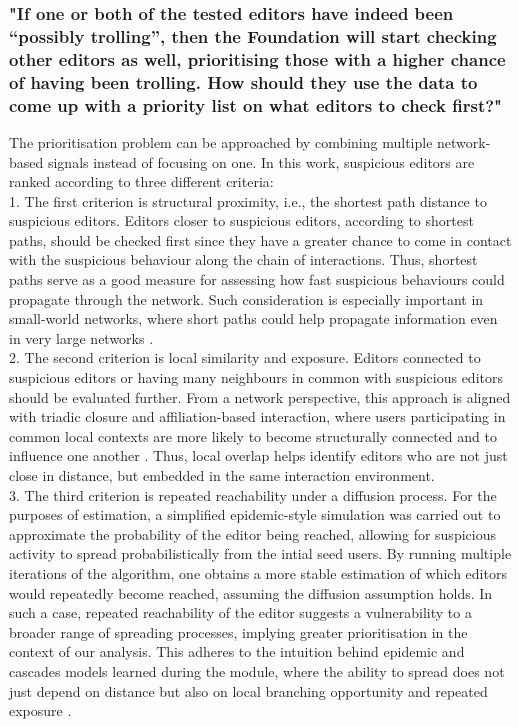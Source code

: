 \documentclass[acmsmall,nonacm,natbib=false]{acmart}
\begin{document}
\subsubsection{\large\textbf{{"If one or both of the tested editors have indeed been “possibly trolling”, then the Foundation will start checking other editors as well, prioritising those with a higher chance of having been trolling. How should they use the data to come up with a priority list on what editors to check first?"}}}
\leavevmode \par \noindent
The prioritisation problem can be approached by combining multiple network-based signals instead of focusing on one. In this work, suspicious editors are ranked according to three different criteria:\-\\
1. The first criterion is structural proximity, i.e., the shortest path distance to suspicious editors. Editors closer to suspicious editors, according to shortest paths, should be checked first since they have a greater chance to come in contact with the suspicious behaviour along the chain of interactions. Thus, shortest paths serve as a good measure for assessing how fast suspicious behaviours could propagate through the network. Such consideration is especially important in small-world networks, where short paths could help propagate information even in very large networks \cite{watts1998collective,milgram1967smallworld}.\\
2. The second criterion is local similarity and exposure. Editors connected to suspicious editors or having many neighbours in common with suspicious editors should be evaluated further. From a network perspective, this approach is aligned with triadic closure and affiliation-based interaction, where users participating in common local contexts are more likely to become structurally connected and to influence one another \cite{easley2010networks}. Thus, local overlap helps identify editors who are not just close in distance, but embedded in the same interaction environment.\\
3. The third criterion is repeated reachability under a diffusion process. For the purposes of estimation, a simplified epidemic-style simulation was carried out to approximate the probability of the editor being reached, allowing for suspicious activity to spread probabilistically from the intial seed users. By running multiple iterations of the algorithm, one obtains a more stable estimation of which editors would repeatedly become reached, assuming the diffusion assumption holds.  In such a case, repeated reachability of the editor suggests a vulnerability to a broader range of spreading processes, implying greater prioritisation in the context of our analysis. This adheres to the intuition behind epidemic and cascades models learned during the module, where the ability to spread does not just depend on distance but also on local branching opportunity and repeated exposure \cite{easley2010networks}.\\
\end{document}
